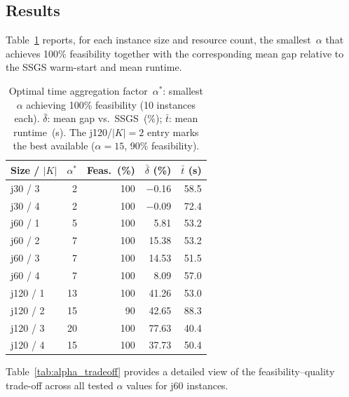 \subsection{Results}
\label{subsec:alpha_results}
Table~\ref{tab:alpha_optimal} reports, for each instance size
and resource count, the smallest~$\alpha$ that achieves 100\%
feasibility together with the corresponding mean gap relative
to the SSGS warm-start and mean runtime.
\begin{table}[htbp]
\centering
\renewcommand{\arraystretch}{1.35}
\caption{Optimal time aggregation factor~$\alpha^*$: smallest
         $\alpha$ achieving 100\% feasibility (10 instances each).
         $\bar{\delta}$: mean gap vs.\ SSGS~(\%);
         $\bar{t}$: mean runtime~(s). The j120/$|K|{=}2$ entry
         marks the best available ($\alpha{=}15$, 90\% feasibility).}
\label{tab:alpha_optimal}
\begin{tabular}{l r r r r}
\hline
\textbf{Size / $|K|$} &
$\alpha^*$ &
\textbf{Feas.~(\%)} &
$\bar{\delta}$ (\%) &
$\bar{t}$ (s) \\
\hline
j30 / 3  &  2 & 100 & $-$0.16 & 58.5 \\
j30 / 4  &  2 & 100 & $-$0.09 & 72.4 \\
\hline
j60 / 1  &  5 & 100 &    5.81 & 53.2 \\
j60 / 2  &  7 & 100 &   15.38 & 53.2 \\
j60 / 3  &  7 & 100 &   14.53 & 51.5 \\
j60 / 4  &  7 & 100 &    8.09 & 57.0 \\
\hline
j120 / 1 & 13 & 100 &   41.26 & 53.0 \\
j120 / 2 & 15 &  90 &   42.65 & 88.3 \\
j120 / 3 & 20 & 100 &   77.63 & 40.4 \\
j120 / 4 & 15 & 100 &   37.73 & 50.4 \\
\hline
\end{tabular}
\end{table}
Table~\ref{tab:alpha_tradeoff} provides a detailed view of the
feasibility--quality trade-off across all tested $\alpha$ values
for j60 instances.

